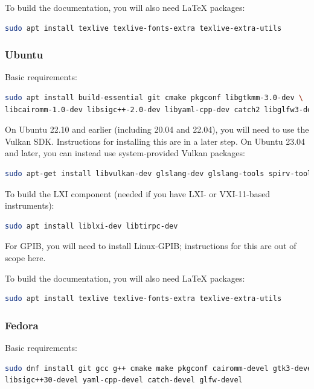 \begin{enumerate}
To build the documentation, you will also need LaTeX packages:
\begin{lstlisting}[language=sh, numbers=none]
sudo apt install texlive texlive-fonts-extra texlive-extra-utils
\end{lstlisting}

\subsubsection{Ubuntu}

Basic requirements:
\begin{lstlisting}[language=sh, numbers=none]
sudo apt install build-essential git cmake pkgconf libgtkmm-3.0-dev \
libcairomm-1.0-dev libsigc++-2.0-dev libyaml-cpp-dev catch2 libglfw3-dev curl xzip
\end{lstlisting}

On Ubuntu 22.10 and earlier (including 20.04 and 22.04), you will need to use the Vulkan SDK.
Instructions for installing this are in a later step. On Ubuntu 23.04 and later, you can instead
use system-provided Vulkan packages:
\begin{lstlisting}[language=sh, numbers=none]
sudo apt-get install libvulkan-dev glslang-dev glslang-tools spirv-tools glslc
\end{lstlisting}


To build the LXI component (needed if you have LXI- or VXI-11-based instruments):
\begin{lstlisting}[language=sh, numbers=none]
sudo apt install liblxi-dev libtirpc-dev
\end{lstlisting}

For GPIB, you will need to install Linux-GPIB; instructions for this are out of scope here.

To build the documentation, you will also need LaTeX packages:
\begin{lstlisting}[language=sh, numbers=none]
sudo apt install texlive texlive-fonts-extra texlive-extra-utils
\end{lstlisting}


\subsubsection{Fedora}
Basic requirements:
\begin{lstlisting}[language=sh, numbers=none]
sudo dnf install git gcc g++ cmake make pkgconf cairomm-devel gtk3-devel \
libsigc++30-devel yaml-cpp-devel catch-devel glfw-devel
\end{lstlisting}


\end{enumerate}
